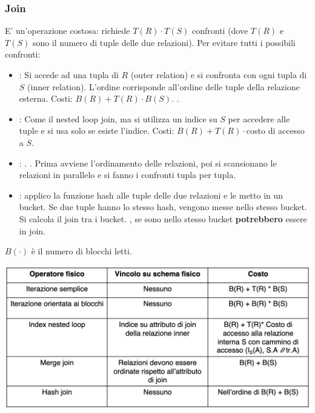 \documentclass[12pt, a4paper]{report}
\begin{document}
    \subsubsection{Join}
    E' un'operazione costosa: richiede $T(R)\cdot T(S)$ confronti (dove $T(R)$ e $T(S)$ sono il numero di tuple delle due relazioni). Per evitare tutti i possibili confronti:
    \begin{itemize}
        \item {}: Si accede ad una tupla di $R$ (outer relation) e si confronta con ogni tupla di $S$ (inner relation). L'ordine corrisponde all'ordine delle tuple della relazione esterna. Costi: $B(R) + T(R) \cdot B(S)$. .
        \item {}: Come il nested loop join, ma si utilizza un indice su $S$ per accedere alle tuple e si usa solo se esiste l'indice. Costi: $B(R)+T(R) \cdot$costo di accesso a $S$.
        \item {}: . . Prima avviene l'ordinamento delle relazioni, poi si scansionano le relazioni in parallelo e si fanno i confronti tupla per tupla.
        \item {}: applico la funzione hash alle tuple delle due relazioni e le metto in un bucket. Se due tuple hanno lo stesso hash, vengono messe nello stesso bucket. Si calcola il join tra i bucket. , se sono nello stesso bucket \textbf{potrebbero} essere in join.
    \end{itemize}
    $B(\cdot)$ è il numero di blocchi letti.
    \begin{center}
        \includegraphics[scale=0.5]{Appunti Latex/Immagini/opfisici.png}
    \end{center}
\end{document}
